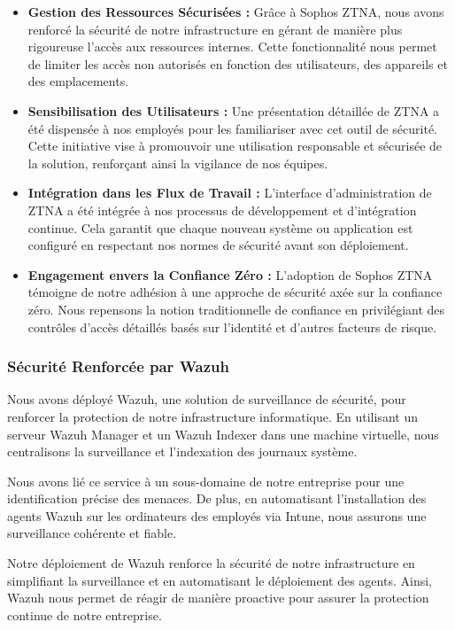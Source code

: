 \begin{itemize}
    \item \textbf{Gestion des Ressources Sécurisées :} Grâce à Sophos ZTNA, nous avons renforcé la sécurité de notre infrastructure en gérant de manière plus rigoureuse l'accès aux ressources internes.
    Cette fonctionnalité nous permet de limiter les accès non autorisés en fonction des utilisateurs, des appareils et des emplacements.
    \item \textbf{Sensibilisation des Utilisateurs :} Une présentation détaillée de ZTNA a été dispensée à nos employés pour les familiariser avec cet outil de sécurité.
    Cette initiative vise à promouvoir une utilisation responsable et sécurisée de la solution, renforçant ainsi la vigilance de nos équipes.
    \item \textbf{Intégration dans les Flux de Travail :} L'interface d'administration de ZTNA a été intégrée à nos processus de développement et d'intégration continue.
    Cela garantit que chaque nouveau système ou application est configuré en respectant nos normes de sécurité avant son déploiement.
    \item \textbf{Engagement envers la Confiance Zéro :} L'adoption de Sophos ZTNA témoigne de notre adhésion à une approche de sécurité axée sur la confiance zéro.
    Nous repensons la notion traditionnelle de confiance en privilégiant des contrôles d'accès détaillés basés sur l'identité et d'autres facteurs de risque.
\end{itemize}

\subsubsection{Sécurité Renforcée par Wazuh}

Nous avons déployé Wazuh, une solution de surveillance de sécurité, pour renforcer la protection de notre infrastructure informatique.
En utilisant un serveur Wazuh Manager et un Wazuh Indexer dans une machine virtuelle, nous centralisons la surveillance et l'indexation des journaux système.

Nous avons lié ce service à un sous-domaine de notre entreprise pour une identification précise des menaces.
De plus, en automatisant l'installation des agents Wazuh sur les ordinateurs des employés via Intune, nous assurons une surveillance cohérente et fiable.

Notre déploiement de Wazuh renforce la sécurité de notre infrastructure en simplifiant la surveillance et en automatisant le déploiement des agents.
Ainsi, Wazuh nous permet de réagir de manière proactive pour assurer la protection continue de notre entreprise.

